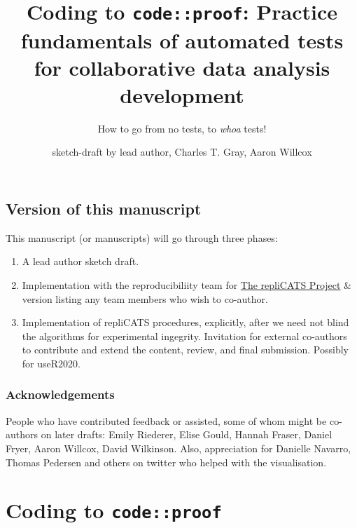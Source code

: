 \documentclass[
]{article}
\title{Coding to \texttt{code::proof}: Practice fundamentals of
automated tests for collaborative data analysis development}
\subtitle{How to go from no tests, to \emph{whoa} tests!}
\author{sketch-draft by lead author, Charles T. Gray, Aaron Willcox}
\date{}
\providecommand{\tightlist}{%
  \setlength{\itemsep}{0pt}\setlength{\parskip}{0pt}}
\begin{document}
\maketitle

\newcommand{\codereg}[1]{
\fbox{\begin{minipage}{15em}
#1
\end{minipage}}
}

\hypertarget{version-of-this-manuscript}{%
\subsection{Version of this
manuscript}\label{version-of-this-manuscript}}

This manuscript (or manuscripts) will go through three phases:

\begin{enumerate}
\def\labelenumi{\arabic{enumi}.}
\tightlist
\item
  A lead author sketch draft.
\item
  Implementation with the reproducibiliity team for
  \href{https://replicats.research.unimelb.edu.au/}{The repliCATS
  Project} \& version listing any team members who wish to co-author.
\item
  Implementation of repliCATS procedures, explicitly, after we need not
  blind the algorithms for experimental ingegrity. Invitation for
  external co-authors to contribute and extend the content, review, and
  final submission. Possibly for useR2020.
\end{enumerate}

\hypertarget{acknowledgements}{%
\subsubsection{Acknowledgements}\label{acknowledgements}}

People who have contributed feedback or assisted, some of whom might be
co-authors on later drafts: Emily Riederer, Elise Gould, Hannah Fraser,
Daniel Fryer, Aaron Willcox, David Wilkinson. Also, appreciation for
Danielle Navarro, Thomas Pedersen and others on twitter who helped with
the visualisation.

\hypertarget{coding-to-codeproof}{%
\section{\texorpdfstring{Coding to
\texttt{code::proof}}{Coding to code::proof}}\label{coding-to-codeproof}}
\end{document}
